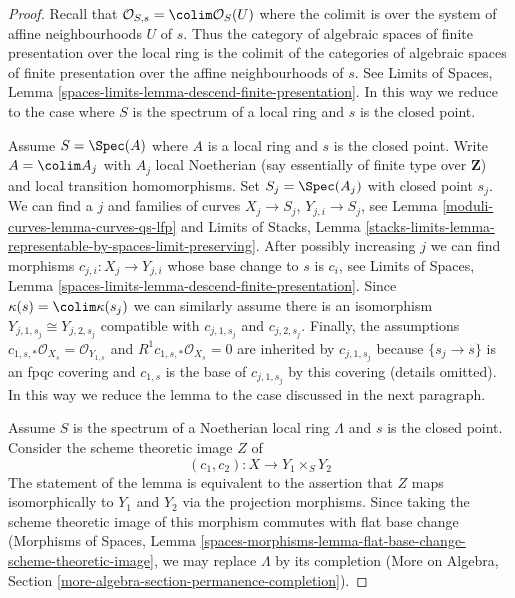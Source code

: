 \begin{proof}
Recall that $\mathcal{O}_{S, s} = \colim \mathcal{O}_S(U)$ where
the colimit is over the system of affine neighbourhoods $U$ of $s$.
Thus the category of algebraic spaces of finite presentation over
the local ring is the colimit of the categories of algebraic spaces
of finite presentation over the affine neighbourhoods of $s$.
See Limits of Spaces, Lemma
\ref{spaces-limits-lemma-descend-finite-presentation}.
In this way we reduce to the case where $S$ is the spectrum of
a local ring and $s$ is the closed point.

\medskip\noindent
Assume $S = \Spec(A)$ where $A$ is a local ring and $s$ is the closed point.
Write $A = \colim A_j$ with $A_j$ local Noetherian (say essentially
of finite type over $\mathbf{Z}$) and local transition homomorphisms.
Set $S_j = \Spec(A_j)$ with closed point $s_j$. We can find a
$j$ and families of curves $X_j \to S_j$, $Y_{j, i} \to S_j$,
see Lemma \ref{moduli-curves-lemma-curves-qs-lfp} and
Limits of Stacks, Lemma
\ref{stacks-limits-lemma-representable-by-spaces-limit-preserving}.
After possibly increasing $j$ we can find morphisms
$c_{j, i} : X_j \to Y_{j, i}$ whose base change to $s$ is $c_i$, see
Limits of Spaces, Lemma
\ref{spaces-limits-lemma-descend-finite-presentation}.
Since $\kappa(s) = \colim \kappa(s_j)$ we can similarly
assume there is an isomorphism $Y_{j, 1, s_j} \cong Y_{j, 2, s_j}$
compatible with $c_{j, 1, s_j}$ and $c_{j, 2, s_j}$.
Finally, the assumptions
$c_{1, s, *}\mathcal{O}_{X_s} = \mathcal{O}_{Y_{1, s}}$ and
$R^1c_{1, s, *}\mathcal{O}_{X_s} = 0$
are inherited by $c_{j, 1, s_j}$ because
$\{s_j \to s\}$ is an fpqc covering and
$c_{1, s}$ is the base of $c_{j, 1, s_j}$ by this covering (details omitted).
In this way we reduce the lemma to the case discussed in the next paragraph.

\medskip\noindent
Assume $S$ is the spectrum of a Noetherian local ring $\Lambda$ and
$s$ is the closed point. Consider the scheme theoretic image $Z$ of
$$
(c_1, c_2) : X \longrightarrow Y_1 \times_S Y_2
$$
The statement of the lemma is equivalent to the assertion that $Z$ maps
isomorphically to $Y_1$ and $Y_2$ via the projection morphisms.
Since taking the scheme theoretic image of this morphism commutes
with flat base change (Morphisms of Spaces, Lemma
\ref{spaces-morphisms-lemma-flat-base-change-scheme-theoretic-image},
we may replace $\Lambda$ by its completion
(More on Algebra, Section \ref{more-algebra-section-permanence-completion}).


\end{proof}
